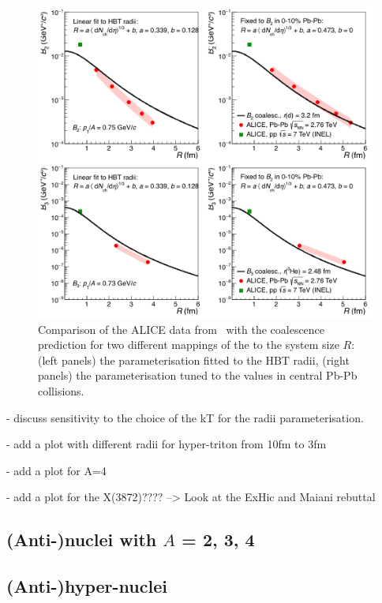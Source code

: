 \documentclass[a4paper,11pt]{scrartcl} %
\begin{document}
 \begin{figure}[htbp]
\begin{center}
\includegraphics[width=\textwidth]{radiiParamCompareData.png}
\caption{Comparison of the ALICE data from~\cite{ALICE:deuteronppPbPb2015,ALICE:nucleipp2017} with the coalescence prediction for two different mappings of the \avdNdeta to the system size $R$: (left panels) the parameterisation fitted to the HBT radii, (right panels) the parameterisation tuned to the \btwo values in central Pb-Pb collisions.}
\label{fig:CompareB2B3forDifferentParamWithData}
\end{center}
\end{figure}
 
 
- discuss sensitivity to the choice of the kT for the radii parameterisation.

- add a plot with different radii for hyper-triton from 10fm to 3fm

- add a plot for A=4

- add a plot for the X(3872)???? --> Look at the ExHic and Maiani rebuttal


\subsection{(Anti-)nuclei with $A$ = 2, 3, 4}

\subsection{(Anti-)hyper-nuclei}
\end{document}
